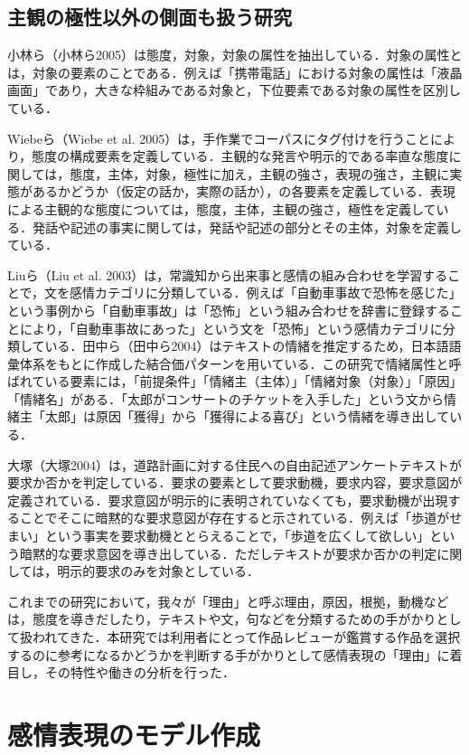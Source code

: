 \documentclass[japanese]{jnlp_1.3a}
\begin{document}
\subsection{主観の極性以外の側面も扱う研究}

小林ら（小林ら2005）は態度，対象，対象の属性を抽出している．対象の属性とは，対象の要素のことである．例えば「携帯電話」における対象の属性は「液晶画面」であり，大きな枠組みである対象と，下位要素である対象の属性を区別している． 

 Wiebeら（Wiebe et al. 2005）は，手作業でコーパスにタグ付けを行うことにより，態度の構成要素を定義している．主観的な発言や明示的である率直な態度に関しては，態度，主体，対象，極性に加え，主観の強さ，表現の強さ，主観に実態があるかどうか（仮定の話か，実際の話か），の各要素を定義している．表現による主観的な態度については，態度，主体，主観の強さ，極性を定義している．発話や記述の事実に関しては，発話や記述の部分とその主体，対象を定義している． 

 Liuら（Liu et al. 2003）は，常識知から出来事と感情の組み合わせを学習することで，文を感情カテゴリに分類している．例えば「自動車事故で恐怖を感じた」という事例から「自動車事故」は「恐怖」という組み合わせを辞書に登録することにより，「自動車事故にあった」という文を「恐怖」という感情カテゴリに分類している．田中ら（田中ら2004）はテキストの情緒を推定するため，日本語語彙体系をもとに作成した結合価パターンを用いている．この研究で情緒属性と呼ばれている要素には，「前提条件」「情緒主（主体）」「情緒対象（対象）」「原因」「情緒名」がある．「太郎がコンサートのチケットを入手した」という文から情緒主「太郎」は原因「獲得」から「獲得による喜び」という情緒を導き出している． 


大塚（大塚2004）は，道路計画に対する住民への自由記述アンケートテキストが要求か否かを判定している．要求の要素として要求動機，要求内容，要求意図が定義されている．要求意図が明示的に表明されていなくても，要求動機が出現することでそこに暗黙的な要求意図が存在すると示されている．例えば「歩道がせまい」という事実を要求動機ととらえることで，「歩道を広くして欲しい」という暗黙的な要求意図を導き出している．ただしテキストが要求か否かの判定に関しては，明示的要求のみを対象としている． 


これまでの研究において，我々が「理由」と呼ぶ理由，原因，根拠，動機などは，態度を導きだしたり，テキストや文，句などを分類するための手がかりとして扱われてきた．本研究では利用者にとって作品レビューが鑑賞する作品を選択するのに参考になるかどうかを判断する手がかりとして感情表現の「理由」に着目し，その特性や働きの分析を行った．

\section{感情表現のモデル作成}
\end{document}
